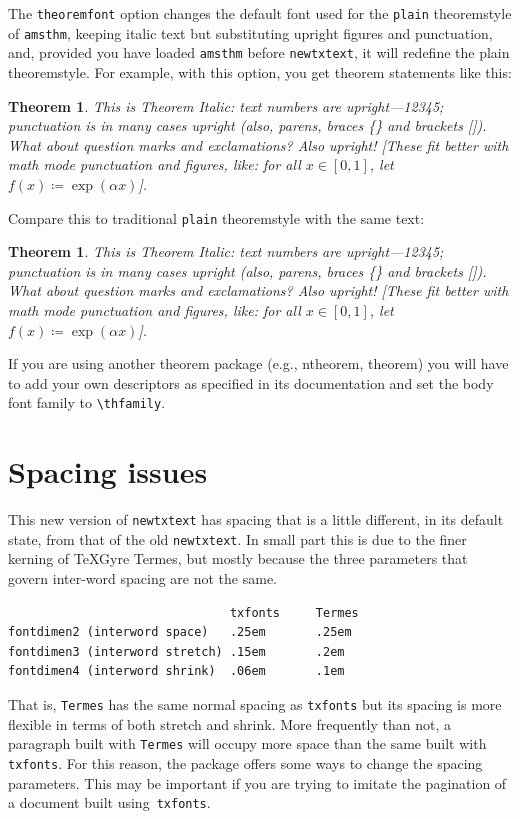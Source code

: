 \documentclass[\fsc]{article}
\theoremstyle{oldplain}
\newtheorem{oldthm}{Theorem}[section]
\theoremstyle{plain}
\newtheorem{thm}{Theorem}[section]
\begin{document}
The {\tt theoremfont} option changes the default font used for the {\tt plain} theoremstyle of {\tt amsthm}, keeping italic text but substituting upright figures and punctuation, and, provided you have loaded {\tt amsthm} before {\tt newtxtext}, it will redefine the plain theoremstyle.  For example, with this option, you get theorem statements like this:

\begin{thm}
This is Theorem Italic: text numbers are upright---12345; punctuation is in many cases upright (also, parens, braces \{\} and brackets []). What about question marks and exclamations? Also upright! [These fit better with math mode punctuation and figures, like: for all $x\in[0,1]$, let $f(x)\coloneq \exp(\alpha x)$].
\end{thm}
Compare this to traditional {\tt plain} theoremstyle with the same text:
\begin{oldthm}
This is Theorem Italic: text numbers are upright---12345; punctuation is in many cases upright (also, parens, braces \{\} and brackets []). What about question marks and exclamations? Also upright! [These fit better with math mode punctuation and figures, like: for all $x\in[0,1]$, let $f(x)\coloneq \exp(\alpha x)$].
\end{oldthm}

If you are using another theorem package (e.g., ntheorem, theorem) you will have to add your own descriptors as specified in its documentation and set the body font family to \verb|\thfamily|.

\section{Spacing issues}
This new version of {\tt newtxtext} has spacing that is a little different, in its default state, from that of the old {\tt newtxtext}. In small part this is due to the finer kerning of TeXGyre Termes, but mostly because the three parameters that govern inter-word spacing are not the same.
\begin{verbatim}
                               txfonts     Termes
fontdimen2 (interword space)   .25em       .25em
fontdimen3 (interword stretch) .15em       .2em
fontdimen4 (interword shrink)  .06em       .1em
\end{verbatim}
That is, {\tt Termes} has the same normal spacing as {\tt txfonts} but its spacing is more flexible in terms of both stretch and shrink. More frequently than not, a paragraph built with {\tt Termes} will occupy more space than the same built with {\tt txfonts}. For this reason, the package offers some ways to change the spacing parameters. This may be important if you are trying to imitate the pagination of a document built using~{\tt txfonts}.
\end{document}
